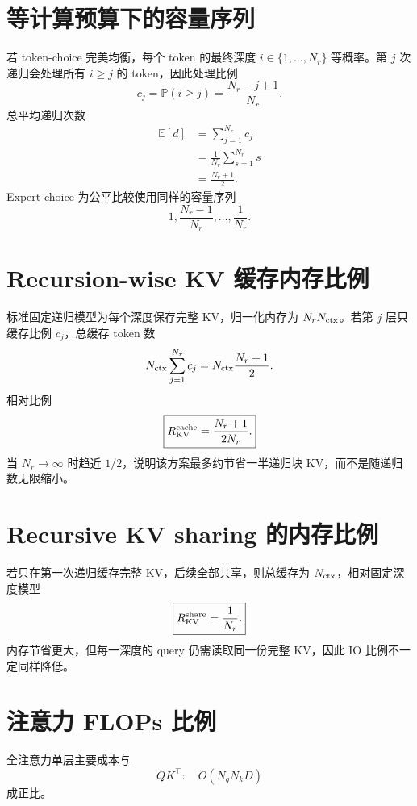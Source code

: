 \documentclass[UTF8,12pt,a4paper,fontset=none]{ctexart}
\numberwithin{equation}{section}
\newcommand{\E}{\mathbb{E}}
\newcommand{\Prob}{\mathbb{P}}
\begin{document}
\section{等计算预算下的容量序列}
若 token-choice 完美均衡，每个 token 的最终深度 $i\in\{1,\ldots,N_r\}$ 等概率。第 $j$ 次递归会处理所有 $i\ge j$ 的 token，因此处理比例
\begin{equation}
 c_j=\Prob(i\ge j)=\frac{N_r-j+1}{N_r}.
\end{equation}
总平均递归次数
\begin{align}
 \E[d]
 &=\sum_{j=1}^{N_r}c_j\\
 &=\frac1{N_r}\sum_{s=1}^{N_r}s\\
 &=\boxed{\frac{N_r+1}{2}}.
\end{align}
Expert-choice 为公平比较使用同样的容量序列
\begin{equation}
 1,\frac{N_r-1}{N_r},\ldots,\frac1{N_r}.
\end{equation}

\section{Recursion-wise KV 缓存内存比例}
标准固定递归模型为每个深度保存完整 KV，归一化内存为 $N_rN_{\rm ctx}$。若第 $j$ 层只缓存比例 $c_j$，总缓存 token 数
\begin{equation}
 N_{\rm ctx}\sum_{j=1}^{N_r}c_j
 =N_{\rm ctx}\frac{N_r+1}{2}.
\end{equation}
相对比例
\begin{equation}
 \boxed{R_{\rm KV}^{\rm cache}
 =\frac{N_r+1}{2N_r}.}
\end{equation}
当 $N_r\to\infty$ 时趋近 $1/2$，说明该方案最多约节省一半递归块 KV，而不是随递归数无限缩小。

\section{Recursive KV sharing 的内存比例}
若只在第一次递归缓存完整 KV，后续全部共享，则总缓存为 $N_{\rm ctx}$，相对固定深度模型
\begin{equation}
 \boxed{R_{\rm KV}^{\rm share}=\frac1{N_r}.}
\end{equation}
内存节省更大，但每一深度的 query 仍需读取同一份完整 KV，因此 IO 比例不一定同样降低。

\section{注意力 FLOPs 比例}
全注意力单层主要成本与
\begin{equation}
 QK^\top:\quad O(N_qN_kD)
\end{equation}
成正比。
\end{document}
